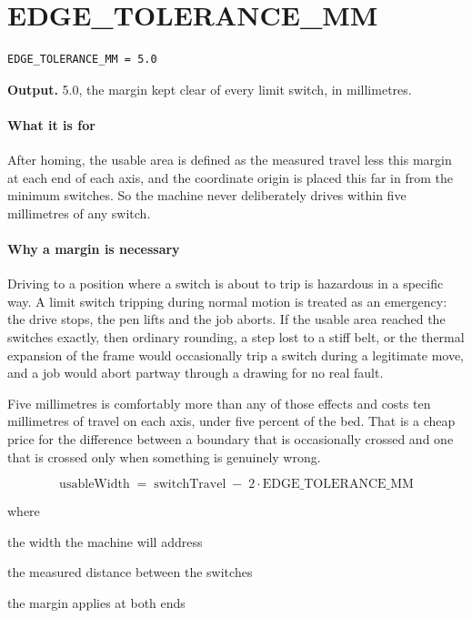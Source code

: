 \section{EDGE\_TOLERANCE\_MM}
\begin{lstlisting}[style=sig]
EDGE_TOLERANCE_MM = 5.0
\end{lstlisting}

\noindent\textbf{Output.} 5.0, the margin kept clear of every limit switch, in millimetres.


\paragraph{What it is for}
After homing, the usable area is defined as the measured travel less this margin at each end of each axis, and the coordinate origin is placed this far in from the minimum switches. So the machine never deliberately drives within five millimetres of any switch.


\paragraph{Why a margin is necessary}
Driving to a position where a switch is about to trip is hazardous in a specific way. A limit switch tripping during normal motion is treated as an emergency: the drive stops, the pen lifts and the job aborts. If the usable area reached the switches exactly, then ordinary rounding, a step lost to a stiff belt, or the thermal expansion of the frame would occasionally trip a switch during a legitimate move, and a job would abort partway through a drawing for no real fault.

Five millimetres is comfortably more than any of those effects and costs ten millimetres of travel on each axis, under five percent of the bed. That is a cheap price for the difference between a boundary that is occasionally crossed and one that is crossed only when something is genuinely wrong.


\begin{equation}
\mathrm{usableWidth} \;=\; \mathrm{switchTravel} \;-\; 2 \cdot \mathrm{EDGE\_TOLERANCE\_MM}
\end{equation}

\noindent where
\begin{description}[leftmargin=2.4em,style=nextline,font=\normalfont\ttfamily]\setlength\itemsep{1pt}
  \item[{$\mathrm{usableWidth}$}] \normalfont the width the machine will address
  \item[{$\mathrm{switchTravel}$}] \normalfont the measured distance between the switches
  \item[{$2$}] \normalfont the margin applies at both ends
\end{description}

